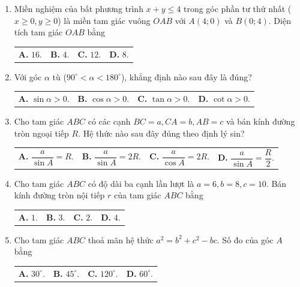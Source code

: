 \documentclass[12pt,a4paper]{article}
\makeatletter
\newcommand{\four}[4]{\par\noindent\begin{tabularx}{\linewidth}{@{}*{4}{>{\raggedright\arraybackslash}X}@{}}\textbf{A.} #1&\textbf{B.} #2&\textbf{C.} #3&\textbf{D.} #4\end{tabularx}}
\makeatother
\begin{document}
\begin{enumerate}
\item Miền nghiệm của bất phương trình $x + y \le 4$ trong góc phần tư thứ nhất ($x \ge 0, y \ge 0$) là miền tam giác vuông $OAB$ với $A(4; 0)$ và $B(0; 4)$. Diện tích tam giác $OAB$ bằng
\four{$16$.}{$4$.}{$12$.}{$8$.}

\item Với góc $\alpha$ tù ($90^\circ < \alpha < 180^\circ$), khẳng định nào sau đây là đúng?
\four{$\sin \alpha > 0$.}{$\cos \alpha > 0$.}{$\tan \alpha > 0$.}{$\cot \alpha > 0$.}

\item Cho tam giác $ABC$ có các cạnh $BC = a, CA = b, AB = c$ và bán kính đường tròn ngoại tiếp $R$. Hệ thức nào sau đây đúng theo định lý sin?
\four{$\dfrac{a}{\sin A} = R$.}{$\dfrac{a}{\sin A} = 2R$.}{$\dfrac{a}{\cos A} = 2R$.}{$\dfrac{a}{\sin A} = \dfrac{R}{2}$.}

\item Cho tam giác $ABC$ có độ dài ba cạnh lần lượt là $a = 6, b = 8, c = 10$. Bán kính đường tròn nội tiếp $r$ của tam giác $ABC$ bằng
\four{$1$.}{$3$.}{$2$.}{$4$.}

\item Cho tam giác $ABC$ thoả mãn hệ thức $a^2 = b^2 + c^2 - bc$. Số đo của góc $A$ bằng
\four{$30^\circ$.}{$45^\circ$.}{$120^\circ$.}{$60^\circ$.}
\end{enumerate}
\newpage
\end{document}
